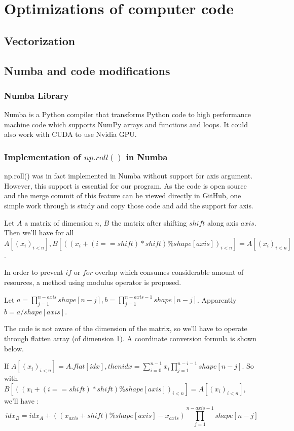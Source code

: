 \chapter{Optimizations of computer code}
\label{cha:optimizaiton}


\section{Vectorization}
\label{sec:optimizaiton_vectorization}

\section{Numba and code modifications}
\label{sec:optimizaiton_numba}
\subsection{Numba Library}
\label{ssec:numba_numba}
Numba is a Python compiler that transforms Python code to high performance machine code which supports NumPy arrays and functions and loops.
It could also work with CUDA to use Nvidia GPU.

\subsection{Implementation of $np.roll()$ in Numba}
\label{ssec:numba_nproll}
np.roll() was in fact implemented in Numba without support for axis argument.
However, this support is essential for our program. As the code is open source and the merge
commit of this feature can be viewed directly in GitHub, one simple work through is study
and copy those code and add the support for axis.

Let $A$ a matrix of dimension $n$, $B$ the matrix after shifting $shift$ along axis $axis$. 
Then we'll have for all $A[(x_i)_{i<n}], B[((x_i+(i==shift)*shift)\%shape[axis])_{i<n}]=A[(x_i)_{i<n}]$.

In order to prevent $if$ or $for$ overlap which consumes considerable amount of resources, a method using modulus operator is proposed.

Let $a=\prod^{n-axis}_{j=1}shape[n-j],b=\prod^{n-axis-1}_{j=1}shape[n-j]$. Apparently $b=a/shape[axis]$.

The code is not aware of the dimension of the matrix, so we'll have to operate through flatten array (of dimension 1).
A coordinate conversion formula is shown below.

If $A[(x_i)_{i<n}]=A.flat[idx], then idx=\sum^{n-1}_{i=0}x_i\prod^{n-i-1}_{j=1}shape[n-j]$.
So with $B[((x_i+(i==shift)*shift)\%shape[axis])_{i<n}]=A[(x_i)_{i<n}]$, we'll have : 
$$ idx_B=idx_A+((x_{axis}+shift)\%shape[axis]-x_{axis})\prod^{n-axis-1}_{j=1}shape[n-j]$$

